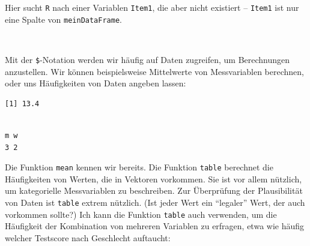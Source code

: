 \documentclass[12pt,]{tufte-book}
\newenvironment{Shaded}{\begin{snugshade}}{\end{snugshade}}
\newcommand{\KeywordTok}[1]{\textcolor[rgb]{0.13,0.29,0.53}{\textbf{#1}}}
\newcommand{\StringTok}[1]{\textcolor[rgb]{0.31,0.60,0.02}{#1}}
\newcommand{\OperatorTok}[1]{\textcolor[rgb]{0.81,0.36,0.00}{\textbf{#1}}}
\newcommand{\NormalTok}[1]{#1}
\theoremstyle{definition}
\theoremstyle{definition}
\theoremstyle{definition}
\theoremstyle{remark}
\begin{document}
\begin{Shaded}
\end{Shaded}

Hier sucht \texttt{R} nach einer Variablen \texttt{Item1}, die aber
nicht existiert -- \texttt{Item1} ist nur eine Spalte von
\texttt{meinDataFrame}.

~

Mit der \texttt{\$}-Notation werden wir häufig auf Daten zugreifen, um
Berechnungen anzustellen. Wir können beispielsweise Mittelwerte von
Messvariablen berechnen, oder uns Häufigkeiten von Daten angeben lassen:

\begin{Shaded}
\end{Shaded}

\begin{verbatim}
[1] 13.4
\end{verbatim}

\begin{Shaded}
\end{Shaded}

\begin{verbatim}

m w 
3 2 
\end{verbatim}

Die Funktion \texttt{mean} kennen wir bereits. Die Funktion
\texttt{table} berechnet die Häufigkeiten von Werten, die in Vektoren
vorkommen. Sie ist vor allem nützlich, um kategorielle Messvariablen zu
beschreiben. Zur Überprüfung der Plausibilität von Daten ist
\texttt{table} extrem nützlich. (Ist jeder Wert ein ``legaler'' Wert,
der auch vorkommen sollte?) Ich kann die Funktion \texttt{table} auch
verwenden, um die Häufigkeit der Kombination von mehreren Variablen zu
erfragen, etwa wie häufig welcher Testscore nach Geschlecht auftaucht:
\end{document}
